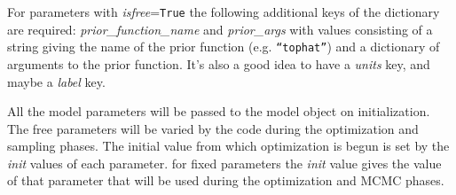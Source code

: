 For parameters with {\it isfree}=\texttt{True} the following
additional keys of the dictionary are required: {\it
prior_function_name} and {\it prior_args} with values consisting of a
string giving the name of the prior function
(e.g. \texttt{``tophat''}) and a dictionary of arguments to the prior
function. It's also a good idea to have a {\it units} key, and maybe a
{\it label} key.

All the model parameters will be passed to the model object on
initialization.  The free parameters will be varied by the code during
the optimization and sampling phases.  The initial value from which
optimization is begun is set by the {\it init} values of each
parameter.  for fixed parameters the {\it init} value gives the value
of that parameter that will be used during the optimization and MCMC
phases.

